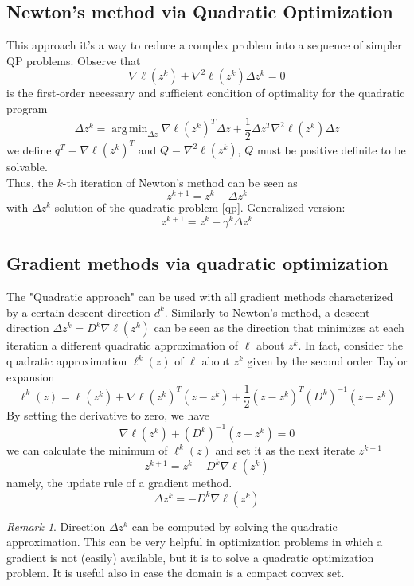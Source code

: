\documentclass[openany]{book}
\DeclareMathOperator*{\argmin}{arg\,min}   %
\theoremstyle{definition}
\theoremstyle{remark}
\newtheorem*{remark}{Remark}
\begin{document}
\subsection{Newton's method via Quadratic Optimization}
This approach it's a way to reduce a complex problem into a sequence of simpler QP problems.
Observe that 
\[
    \nabla\ell(z^k) +\nabla^2\ell(z^k)\Delta z^k = 0
\]
is the first-order necessary and sufficient condition of optimality for the quadratic program 
\begin{equation}
    \label{qp}
    \Delta z^k = \argmin_{\Delta z}\nabla\ell(z^k)^T \Delta z+\displaystyle\frac{1}{2}\Delta z^T\nabla^2\ell(z^k)\Delta z
\end{equation}
we define $q^T = \nabla\ell(z^k)^T$ and $Q = \nabla^2\ell(z^k)$, $Q$ must be positive definite to be solvable.\\
Thus, the $k$-th iteration of Newton's method can be seen as 
\[
    z^{k+1} = z^k-\Delta z^k
\]
with $\Delta z^k$ solution of the quadratic problem \eqref{qp}. Generalized version: 
\[
    z^{k+1} = z^k - \gamma^k \Delta z^k
\]

\subsection{Gradient methods via quadratic optimization}
The "Quadratic approach" can be used with all gradient methods characterized by a certain descent direction $d^k$.
Similarly to Newton's method, a descent direction $\Delta z^k=D^k\nabla\ell(z^k)$ can be seen as the direction that minimizes at each iteration a different quadratic approximation of $\ell$ about $z^k$. 
In fact, consider the quadratic approximation $\ell^k(z)$ of $ \ell$ about $z^k$ given by the second order Taylor expansion
\[
    \ell^k(z) = \ell(z^k)+\nabla\ell(z^k)^T(z-z^k)+\displaystyle\frac{1}{2}(z-z^k)^T(D^k)^{-1}(z-z^k)
\]
By setting the derivative to zero, we have 
\[
    \nabla\ell(z^k)+(D^k)^{-1}(z-z^k)=0
\]
we can calculate the minimum of $\ell^k(z)$ and set it as the next iterate $z^{k+1}$
\[
    z^{k+1} = z^k - D^k\nabla\ell(z^k)
\]
namely, the update rule of a gradient method.
\[
    \Delta z^k = -D^k\nabla\ell(z^k)
\]
\begin{remark}
    Direction $\Delta z^k$ can be computed by solving the quadratic approximation. This can be very
    helpful in optimization problems in which a gradient is not (easily) available, but it is to solve a quadratic
    optimization problem. It is useful also in case the domain is a compact convex set.
\end{remark}
\end{document}
